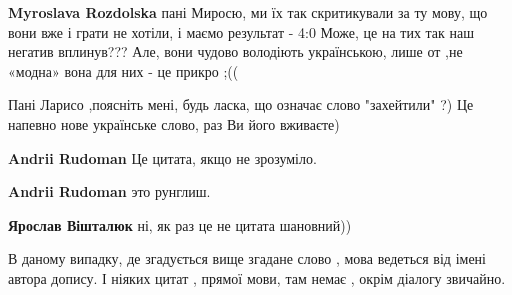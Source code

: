 \begin{itemize}
\begin{itemize}
 
\textbf{Myroslava Rozdolska} пані Миросю, ми їх так скритикували за ту мову, що вони вже і грати не хотіли, і маємо результат - 4:0 Може, це на тих так наш негатив вплинув??? Але, вони чудово володіють українською, лише от ,не «модна» вона для них - це прикро ;((
\end{itemize}

 
Пані Ларисо ,поясніть мені, будь ласка, що означає слово "захейтили" ?) Це напевно нове українське слово, раз Ви його вживаєте)

\begin{itemize}
 
\textbf{Andrii Rudoman} Це цитата, якщо не зрозуміло.

 
\textbf{Andrii Rudoman} это рунглиш.

 
\textbf{Ярослав Вішталюк} ні, як раз це не цитата шановний))

В даному випадку, де згадується вище згадане слово , мова ведеться від імені
автора допису. І ніяких цитат , прямої мови, там немає , окрім діалогу
звичайно.


\end{itemize}
\end{itemize}
